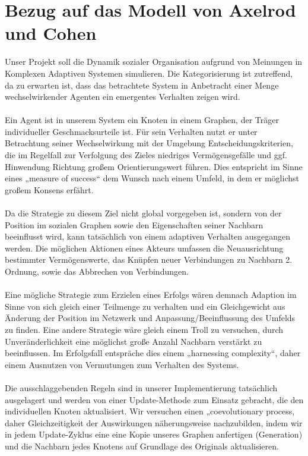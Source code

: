 \documentclass[11pt, a4paper]{scrartcl}
\begin{document}
\section{Bezug auf das Modell von Axelrod und Cohen}
Unser Projekt soll die Dynamik sozialer Organisation aufgrund von Meinungen in Komplexen Adaptiven Systemen simulieren. Die Kategorisierung ist zutreffend, da zu erwarten ist, dass das betrachtete System in Anbetracht einer Menge wechselwirkender Agenten ein emergentes Verhalten zeigen wird. \\
\\
Ein Agent ist in unserem System ein Knoten in einem Graphen, der Träger individueller Geschmacksurteile ist.
Für sein Verhalten nutzt er unter Betrachtung seiner Wechselwirkung mit der Umgebung Entscheidungskriterien, die im Regelfall zur Verfolgung des Zieles niedriges Vermögensgefälle und ggf. Hinwendung Richtung großem Orientierungswert führen. Dies entspricht im Sinne eines „measure of success“ dem Wunsch nach einem Umfeld, in dem er möglichst großem Konsens erfährt.\\
\\
Da die Strategie zu diesem Ziel nicht global vorgegeben ist, sondern von der Position im sozialen Graphen sowie den Eigenschaften seiner Nachbarn beeinflusst wird, kann tatsächlich von einem adaptiven Verhalten ausgegangen werden.
Die möglichen Aktionen eines Akteurs umfassen die Neuausrichtung bestimmter Vermögenswerte, das Knüpfen neuer Verbindungen zu Nachbarn 2. Ordnung, sowie das Abbrechen von Verbindungen.\\
\\
Eine mögliche Strategie zum Erzielen eines Erfolgs wären demnach Adaption im Sinne von sich gleich einer Teilmenge zu verhalten und ein Gleichgewicht aus Änderung der Position im Netzwerk und Anpassung/Beeinflussung des Umfelds zu finden. Eine andere Strategie wäre gleich einem Troll zu versuchen, durch Unveränderlichkeit eine möglichst große Anzahl Nachbarn verstärkt zu beeinflussen.
Im Erfolgsfall entspräche dies einem „harnessing complexity“, daher einem Ausnutzen von Vermutungen zum Verhalten des Systems.\\
\\
Die ausschlaggebenden Regeln sind in unserer Implementierung tatsächlich ausgelagert und werden von einer Update-Methode zum Einsatz gebracht, die den individuellen Knoten aktualisiert.
Wir versuchen einen „coevolutionary process, daher Gleichzeitigkeit der Auswirkungen näherungsweise  nachzubilden, indem wir in jedem Update-Zyklus eine eine Kopie unseres Graphen anfertigen (Generation) und die Nachbarn jedes Knotens auf Grundlage des Originals aktualisieren.\\
\end{document}
